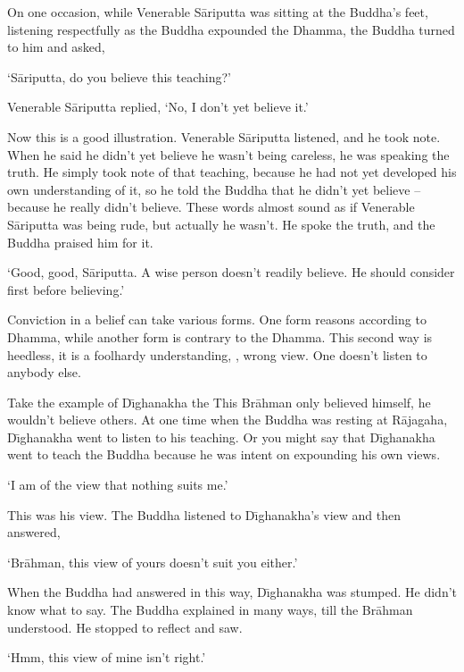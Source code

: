 On one occasion, while Venerable S\=ariputta was sitting at the Buddha's feet, listening respectfully as the Buddha expounded the Dhamma, the Buddha turned to him and asked, 

`S\=ariputta, do you believe this teaching?' 

Venerable S\=ariputta replied, `No, I don't yet believe it.' 

Now this is a good illustration. Venerable S\=ariputta listened, and he took note. When he said he didn't yet believe he wasn't being careless, he was speaking the truth. He simply took note of that teaching, because he had not yet developed his own understanding of it, so he told the Buddha that he didn't yet believe -- because he really didn't believe. These words almost sound as if Venerable S\=ariputta was being rude, but actually he wasn't. He spoke the truth, and the Buddha praised him for it. 

`Good, good, S\=ariputta. A wise person doesn't readily believe. He should consider first before believing.' 

Conviction in a belief can take various forms. One form reasons according to Dhamma, while another form is contrary to the Dhamma. This second way is heedless, it is a foolhardy understanding, , wrong view. One doesn't listen to anybody else. 

Take the example of D\={\i}ghanakha the  This Br\=ahman only believed himself, he wouldn't believe others. At one time when the Buddha was resting at R\=ajagaha, D\={\i}ghanakha went to listen to his teaching. Or you might say that D\={\i}ghanakha went to teach the Buddha because he was intent on expounding his own views. 

`I am of the view that nothing suits me.' 

This was his view. The Buddha listened to D\={\i}ghanakha's view and then answered, 

`Br\=ahman, this view of yours doesn't suit you either.' 

When the Buddha had answered in this way, D\={\i}ghanakha was stumped. He didn't know what to say. The Buddha explained in many ways, till the Br\=ahman understood. He stopped to reflect and saw.

`Hmm, this view of mine isn't right.' 

